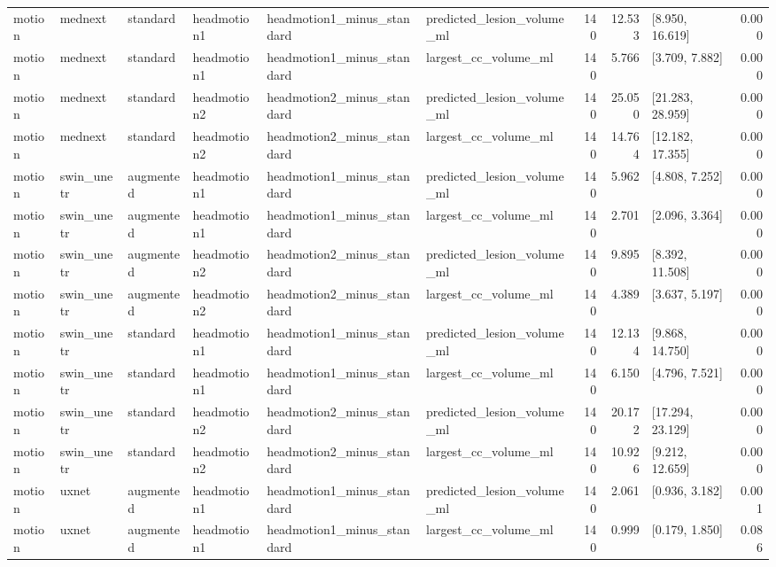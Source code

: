 \begin{table}
\begin{tabular}{llllllrrlr}
motion & mednext & standard & headmotion1 & headmotion1\_minus\_standard & predicted\_lesion\_volume\_ml & 140 & 12.533 & [8.950, 16.619] & 0.000 \\
motion & mednext & standard & headmotion1 & headmotion1\_minus\_standard & largest\_cc\_volume\_ml & 140 & 5.766 & [3.709, 7.882] & 0.000 \\
motion & mednext & standard & headmotion2 & headmotion2\_minus\_standard & predicted\_lesion\_volume\_ml & 140 & 25.050 & [21.283, 28.959] & 0.000 \\
motion & mednext & standard & headmotion2 & headmotion2\_minus\_standard & largest\_cc\_volume\_ml & 140 & 14.764 & [12.182, 17.355] & 0.000 \\
motion & swin\_unetr & augmented & headmotion1 & headmotion1\_minus\_standard & predicted\_lesion\_volume\_ml & 140 & 5.962 & [4.808, 7.252] & 0.000 \\
motion & swin\_unetr & augmented & headmotion1 & headmotion1\_minus\_standard & largest\_cc\_volume\_ml & 140 & 2.701 & [2.096, 3.364] & 0.000 \\
motion & swin\_unetr & augmented & headmotion2 & headmotion2\_minus\_standard & predicted\_lesion\_volume\_ml & 140 & 9.895 & [8.392, 11.508] & 0.000 \\
motion & swin\_unetr & augmented & headmotion2 & headmotion2\_minus\_standard & largest\_cc\_volume\_ml & 140 & 4.389 & [3.637, 5.197] & 0.000 \\
motion & swin\_unetr & standard & headmotion1 & headmotion1\_minus\_standard & predicted\_lesion\_volume\_ml & 140 & 12.134 & [9.868, 14.750] & 0.000 \\
motion & swin\_unetr & standard & headmotion1 & headmotion1\_minus\_standard & largest\_cc\_volume\_ml & 140 & 6.150 & [4.796, 7.521] & 0.000 \\
motion & swin\_unetr & standard & headmotion2 & headmotion2\_minus\_standard & predicted\_lesion\_volume\_ml & 140 & 20.172 & [17.294, 23.129] & 0.000 \\
motion & swin\_unetr & standard & headmotion2 & headmotion2\_minus\_standard & largest\_cc\_volume\_ml & 140 & 10.926 & [9.212, 12.659] & 0.000 \\
motion & uxnet & augmented & headmotion1 & headmotion1\_minus\_standard & predicted\_lesion\_volume\_ml & 140 & 2.061 & [0.936, 3.182] & 0.001 \\
motion & uxnet & augmented & headmotion1 & headmotion1\_minus\_standard & largest\_cc\_volume\_ml & 140 & 0.999 & [0.179, 1.850] & 0.086 \\

\end{tabular}
\end{table}
